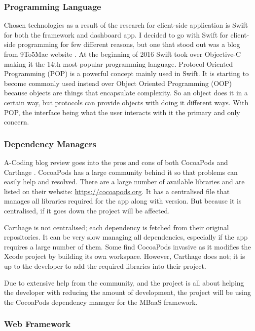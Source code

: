 \subsubsection{Programming Language}

Chosen technologies as a result of the research for client-side application is Swift for both the framework and dashboard app. I decided to go with Swift for client-side programming for few different reasons, but one that stood out was a blog from 9To5Mac website \cite{webserver}. At the beginning of 2016 Swift took over Objective-C making it the 14th most popular programming language. Protocol Oriented Programming (POP) is a powerful concept mainly used in Swift. It is starting to become commonly used instead over Object Oriented Programming (OOP) because objects are things that encapsulate complexity. So an object does it in a certain way, but protocols can provide objects with doing it different ways. With POP, the interface being what the user interacts with it the primary and only concern.

\subsubsection{Dependency Managers}

A-Coding blog review goes into the pros and cons of both CocoaPods and Carthage \cite{acodingwebsite}.  CocoaPods has a large community behind it so that problems can easily help and resolved. There are a large number of available libraries and are listed on their website: \url{https://cocoapods.org}. It has a centralised file that manages all libraries required for the app along with version. But because it is centralised, if it goes down the project will be affected.

Carthage is not centralised; each dependency is fetched from their original repositories. It can be very slow managing all dependencies, especially if the app requires a large number of them. Some find CocoaPods invasive as it modifies the Xcode project by building its own workspace. However, Carthage does not; it is up to the developer to add the required libraries into their project.

Due to extensive help from the community, and the project is all about helping the developer with reducing the amount of development, the project will be using the CocoaPods dependency manager for the MBaaS framework.

\subsubsection{Web Framework}

